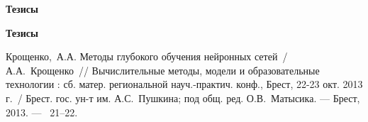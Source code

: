 


\ifx\isabstract\undefined 
\begin{center}
\vspace{3mm}
{\bf Тезисы}
\vspace{3mm}
\end{center}
\else
\vspace{2mm}
{\bf Тезисы}
\vspace{2mm}
\fi

Крощенко,~А.А. Методы глубокого обучения нейронных сетей~/ А.А.~Крощенко~// 
\newblock Вычислительные методы, модели и образовательные технологии : сб. матер. региональной науч.-практич. конф., Брест, 22-23 окт. 2013 г.~/
\newblock Брест. гос. ун-т им. А.С.~Пушкина; под общ. ред. О.В.~Матысика. ---
\newblock Брест, 2013. ---
~21--22.

